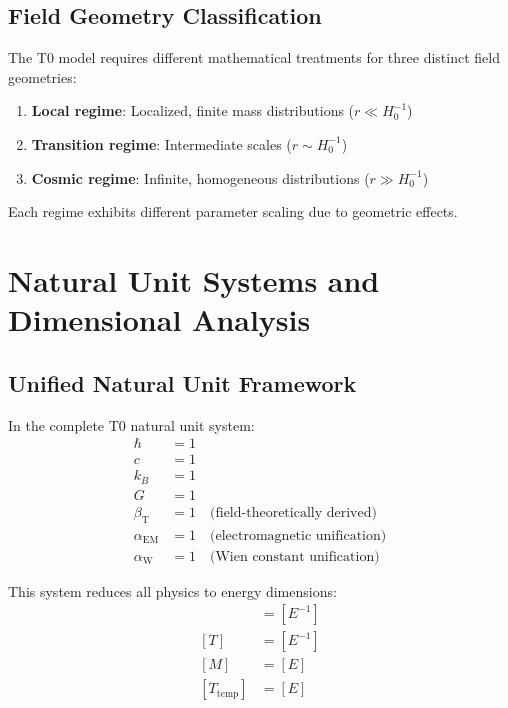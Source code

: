 \documentclass[12pt,a4paper]{article}
\newcommand{\betaT}{\beta_{\text{T}}}
\newcommand{\alphaEM}{\alpha_{\text{EM}}}
\newcommand{\alphaW}{\alpha_{\text{W}}}
\begin{document}
	\subsection{Field Geometry Classification}
	\label{subsec:geometry_classification}
	
	The T0 model requires different mathematical treatments for three distinct field geometries:
	
	\begin{enumerate}
		\item \textbf{Local regime}: Localized, finite mass distributions ($r \ll H_0^{-1}$)
		\item \textbf{Transition regime}: Intermediate scales ($r \sim H_0^{-1}$)
		\item \textbf{Cosmic regime}: Infinite, homogeneous distributions ($r \gg H_0^{-1}$)
	\end{enumerate}
	
	Each regime exhibits different parameter scaling due to geometric effects.
	
	\section{Natural Unit Systems and Dimensional Analysis}
	\label{sec:natural_units}
	
	\subsection{Unified Natural Unit Framework}
	\label{subsec:unified_framework}
	
	In the complete T0 natural unit system:
	\begin{align}
		\hbar &= 1 \\
		c &= 1 \\
		k_B &= 1 \\
		G &= 1 \\
		\betaT &= 1 \quad \text{(field-theoretically derived)} \\
		\alphaEM &= 1 \quad \text{(electromagnetic unification)} \\
		\alphaW &= 1 \quad \text{(Wien constant unification)}
	\end{align}
	
	This system reduces all physics to energy dimensions:
	\begin{align}
		[L] &= [E^{-1}] \\
		[T] &= [E^{-1}] \\
		[M] &= [E] \\
		[T_{\text{temp}}] &= [E]
	\end{align}
	
\end{document}

